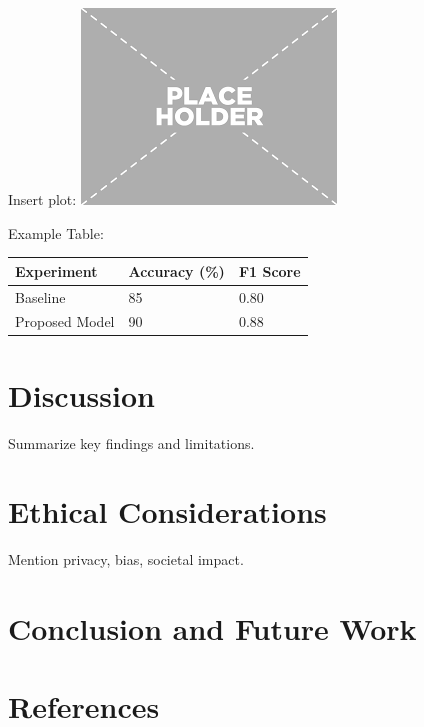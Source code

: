 \documentclass[
  titlepage]{article}
\begin{document}
Insert plot:
\includegraphics[width=0.75\linewidth,height=\textheight,keepaspectratio]{figures/placeholder.png}

Example Table:

\begin{longtable}[]{@{}lll@{}}
\toprule\noalign{}
Experiment & Accuracy (\%) & F1 Score \\
\midrule\noalign{}
\endhead
\bottomrule\noalign{}
\endlastfoot
Baseline & 85 & 0.80 \\
Proposed Model & 90 & 0.88 \\
\end{longtable}

\section{Discussion}\label{discussion}

Summarize key findings and limitations.

\section{Ethical Considerations}\label{ethical-considerations}

Mention privacy, bias, societal impact.

\section{Conclusion and Future Work}\label{conclusion-and-future-work}

\section*{References}\label{references}
\end{document}
